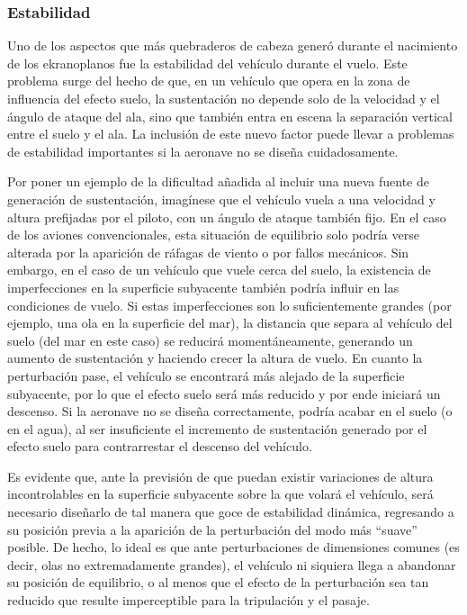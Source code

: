 \subsubsection{Estabilidad}
\label{sec:tests:results:stability}

Uno de los aspectos que más quebraderos de cabeza generó durante el nacimiento de los ekranoplanos fue la estabilidad del vehículo durante el vuelo. Este problema surge del hecho de que, en un vehículo que opera en la zona de influencia del efecto suelo, la sustentación no depende solo de la velocidad y el ángulo de ataque del ala, sino que también entra en escena la separación vertical entre el suelo y el ala. La inclusión de este nuevo factor puede llevar a problemas de estabilidad importantes si la aeronave no se diseña cuidadosamente.

Por poner un ejemplo de la dificultad añadida al incluir una nueva fuente de generación de sustentación, imagínese que el vehículo vuela a una velocidad y altura prefijadas por el piloto, con un ángulo de ataque también fijo. En el caso de los aviones convencionales, esta situación de equilibrio solo podría verse alterada por la aparición de ráfagas de viento o por fallos mecánicos. Sin embargo, en el caso de un vehículo que vuele cerca del suelo, la existencia de imperfecciones en la superficie subyacente también podría influir en las condiciones de vuelo. Si estas imperfecciones son lo suficientemente grandes (por ejemplo, una ola en la superficie del mar), la distancia que separa al vehículo del suelo (del mar en este caso) se reducirá momentáneamente, generando un aumento de sustentación y haciendo crecer la altura de vuelo. En cuanto la perturbación pase, el vehículo se encontrará más alejado de la superficie subyacente, por lo que el efecto suelo será más reducido y por ende iniciará un descenso. Si la aeronave no se diseña correctamente, podría acabar en el suelo (o en el agua), al ser insuficiente el incremento de sustentación generado por el efecto suelo para contrarrestar el descenso del vehículo.

Es evidente que, ante la previsión de que puedan existir variaciones de altura incontrolables en la superficie subyacente sobre la que volará el vehículo, será necesario diseñarlo de tal manera que goce de estabilidad dinámica, regresando a su posición previa a la aparición de la perturbación del modo más “suave” posible. De hecho, lo ideal es que ante perturbaciones de dimensiones comunes (es decir, olas no extremadamente grandes), el vehículo ni siquiera llega a abandonar su posición de equilibrio, o al menos que el efecto de la perturbación sea tan reducido que resulte imperceptible para la tripulación y el pasaje.


